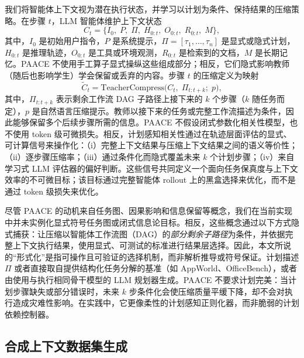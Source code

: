 \documentclass[10pt,twocolumn]{article}
\begin{document}
我们将智能体上下文视为潜在执行状态，并学习以计划为条件、保持结果的压缩策略。在步骤 $t$，LLM 智能体维护上下文状态
\[
C_t=\bigl\{I_0,\;P,\;\Pi,\;H_{0:t},\;O_{0:t},\;R_{0:t},\;M\bigr\},
\]
其中，$I_0$ 是初始用户指令，$P$ 是系统提示，$\Pi=[\tau_1,\dots,\tau_n]$ 是显式或隐式计划，$H_{0:t}$ 是推理轨迹，$O_{0:t}$ 是工具或环境观测，$R_{0:t}$ 是检索到的文档，$M$ 是长期记忆。PAACE 不使用手工算子显式操纵这些组成部分；相反，它们隐式影响教师（随后也影响学生）学会保留或丢弃的内容。步骤 $t$ 的压缩定义为映射
\begin{equation}
\tilde{C}_t=\mathrm{TeacherCompress}\bigl(C_t,\;\Pi_{t:t+k};\;p\bigr),
\end{equation}
其中，$\Pi_{t:t+k}$ 表示剩余工作流 DAG 子路径上接下来的 $k$ 个步骤（$k$ 随任务而定），$p$ 是自然语言压缩提示。教师以接下来的任务或完整工作流描述为条件，因此能够保留多个后续步骤所需的信息。PAACE 不假设闭式参数化相关性模型，也不使用 token 级可微损失。相反，计划感知相关性通过在轨迹层面评估的显式、可计算信号来操作化：（i）完整上下文结果与压缩上下文结果之间的语义等价性；（ii）逐步骤压缩率；（iii）通过条件化而隐式覆盖未来 $k$ 个计划步骤；（iv）来自学习式 LLM 评估器的偏好判断。这些信号共同定义一个面向任务保真度与上下文效率的不可微目标；该目标通过完整智能体 rollout 上的黑盒选择来优化，而不是通过 token 级损失来优化。

尽管 PAACE 的动机来自任务图、因果影响和信息保留等概念，我们在当前实现中并未实例化显式符号任务图或闭式信息论目标。相反，这些概念通过以下方式隐式捕获：让压缩以智能体工作流图（DAG）的\emph{部分剩余子路径}为条件，并依据完整上下文执行结果，使用显式、可测试的标准进行结果层选择。因此，本文所说的“形式化”是指可操作且可验证的选择机制，而非解析推导或符号保证。计划描述 $\Pi$ 或者直接取自提供结构化任务分解的基准（如 AppWorld、OfficeBench），或者由使用与执行相同骨干模型的 LLM 规划器生成。PAACE 不要求计划完美：当计划步骤缺失或部分错误时，未来 $k$ 步条件化会使压缩质量平缓下降，却不会对执行造成灾难性影响。在实践中，它更像柔性的计划感知正则化器，而非脆弱的计划依赖控制器。

\subsection{合成上下文数据集生成}
\end{document}
